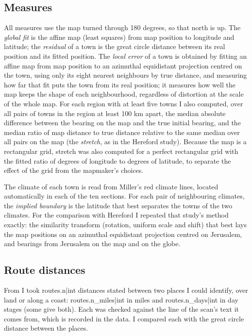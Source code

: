 \documentclass[11pt,a4paper]{article}
\begin{document}
\subsection{Measures}
All measures use the map turned through 180 degrees, so that north is up. The \textit{global fit} is the affine map (least squares) from map position to longitude and latitude; the \textit{residual} of a town is the great circle distance between its real position and its fitted position. The \textit{local error} of a town is obtained by fitting an affine map from map position to an azimuthal equidistant projection centred on the town, using only its eight nearest neighbours by true distance, and measuring how far that fit puts the town from its real position; it measures how well the map keeps the shape of each neighbourhood, regardless of distortion at the scale of the whole map. For each region with at least five towns I also computed, over all pairs of towns in the region at least 100 km apart, the median absolute difference between the bearing on the map and the true initial bearing, and the median ratio of map distance to true distance relative to the same median over all pairs on the map (the \textit{stretch}, as in the Hereford study). Because the map is a rectangular grid, stretch was also computed for a perfect rectangular grid with the fitted ratio of degrees of longitude to degrees of latitude, to separate the effect of the grid from the mapmaker's choices.

The climate of each town is read from Miller's red climate lines, located automatically in each of the ten sections. For each pair of neighbouring climates, the \textit{implied boundary} is the latitude that best separates the towns of the two climates. For the comparison with Hereford I repeated that study's method exactly: the similarity transform (rotation, uniform scale and shift) that best lays the map positions on an azimuthal equidistant projection centred on Jerusalem, and bearings from Jerusalem on the map and on the globe.

\subsection{Route distances}
From \citet{dozy} I took {{routes.n|int}} distances stated between two places I could identify, over land or along a coast: {{routes.n_miles|int}} in miles and {{routes.n_days|int}} in day stages (some give both). Each was checked against the line of the scan's text it comes from, which is recorded in the data. I compared each with the great circle distance between the places.
\end{document}
